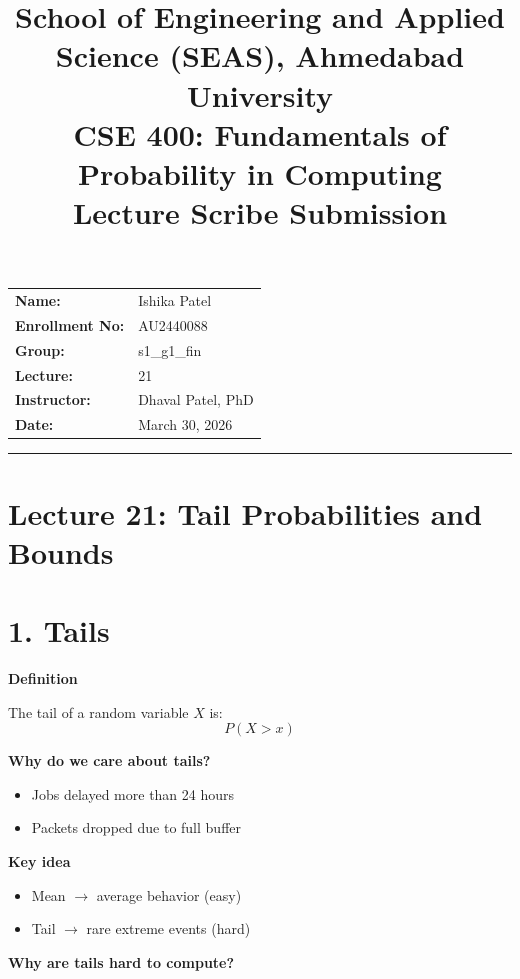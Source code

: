 \documentclass[11pt]{article}
\title{
    \normalsize School of Engineering and Applied Science (SEAS), Ahmedabad University \\
    \vspace{0.2cm}
    \textbf{CSE 400: Fundamentals of Probability in Computing}\\
    \Large Lecture Scribe Submission
}
\author{}
\date{}
\begin{document}
\maketitle

\vspace{-2cm}
\begin{center}
    \begin{tabular}{ll}
        \textbf{Name:} & Ishika Patel \\[1.5ex]
        \textbf{Enrollment No:} & AU2440088 \\[1.5ex]
        \textbf{Group:} & s1\_g1\_fin \\[1.5ex]
        \textbf{Lecture:} & 21 \\[1.5ex]
        \textbf{Instructor:} & Dhaval Patel, PhD \\[1.5ex]
        \textbf{Date:} & March 30, 2026
    \end{tabular}
\end{center}

\hrule
\vspace{0.5cm}


\section*{Lecture 21: Tail Probabilities and Bounds}

\section*{1. Tails}

\textbf{Definition}

The tail of a random variable $X$ is:
\[
P(X > x)
\]

\textbf{Why do we care about tails?}

\begin{itemize}
\item Jobs delayed more than 24 hours
\item Packets dropped due to full buffer
\end{itemize}

\textbf{Key idea}

\begin{itemize}
\item Mean $\rightarrow$ average behavior (easy)
\item Tail $\rightarrow$ rare extreme events (hard)
\end{itemize}

\textbf{Why are tails hard to compute?}
\end{document}
